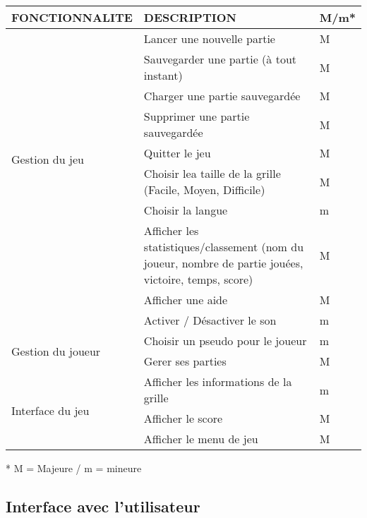 \documentclass[11pt]{article}
\begin{document}
\small
\begin{tabular}{|p{4cm}|p{10cm}|p{1cm}|}
  \hline
  \textbf{FONCTIONNALITE} & \textbf{DESCRIPTION} & \textbf{M/m*}\\
  \hline
     \multirow{8}{*}{Gestion du jeu}
        & Lancer une nouvelle partie                                  & M \\  \cline{2-3}
        & Sauvegarder une partie (à tout instant)                     & M \\  \cline{2-3}
        & Charger une partie sauvegardée                              & M \\  \cline{2-3}
        & Supprimer une partie sauvegardée                            & M \\  \cline{2-3}
        & Quitter le jeu                                              & M \\  \cline{2-3}
        & Choisir lea taille de la grille (Facile, Moyen, Difficile)  & M \\  \cline{2-3}
        & Choisir la langue                                           & m \\  \cline{2-3}
        & Afficher les statistiques/classement (nom du joueur, nombre de partie jouées, victoire, temps, score) & M \\  \cline{2-3}
        & Afficher une aide                                           & M \\  \cline{2-3}
        & Activer / Désactiver le son                                 & m \\
  \hline
     \multirow{2}{*}{Gestion du joueur}
        & Choisir un pseudo pour le joueur                                            & m \\  \cline{2-3}           & Gerer ses parties 														  & M \\  \cline{2-3}
  \hline
     \multirow{3}{*}{Interface du jeu}
        & Afficher les informations de la grille                                                 & m \\  \cline{2-3}
        & Afficher le score                                                       & M \\  \cline{2-3}
        & Afficher le menu de jeu                                                     & M \\
  \hline
\end{tabular}
\normalsize

* M = Majeure / m = mineure



\subsection{Interface avec l'utilisateur}
\end{document}
